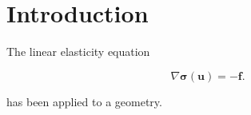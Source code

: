 \section{Introduction}



The linear elasticity equation

\begin{equation}
\label{eq:linEl}
\nabla \bm{\sigma}(\bm{u}) = - \bm{f}.
\end{equation}

has been applied to a geometry.